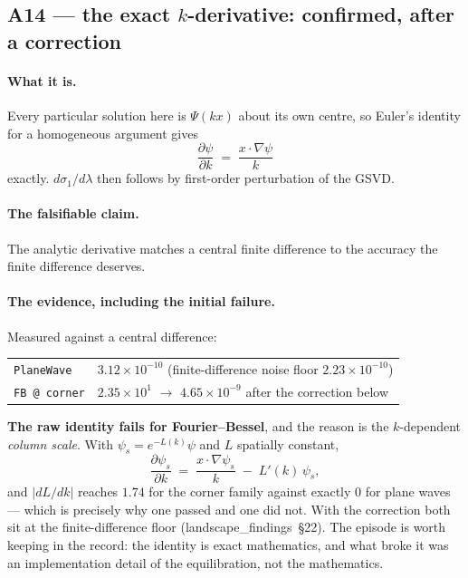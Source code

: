 \documentclass[11pt]{article}
\newcommand{\lf}[1]{(landscape\_findings~\S#1)}
\newcommand{\sig}{\sigma}
\newcommand{\sione}{\sig_1}
\newcommand{\lam}{\lambda}
\begin{document}
\subsection{\texorpdfstring{A14 --- the exact $k$-derivative: confirmed, after a correction}{A14 -- the exact k-derivative: confirmed, after a correction}}

\paragraph{What it is.} Every particular solution here is $\Psi(kx)$ about its own centre, so
Euler's identity for a homogeneous argument gives
\[
  \frac{\partial \psi}{\partial k} \;=\; \frac{x\cdot\nabla\psi}{k}
\]
exactly. $d\sione/d\lam$ then follows by first-order perturbation of the GSVD.

\paragraph{The falsifiable claim.} The analytic derivative matches a central finite difference to
the accuracy the finite difference deserves.

\paragraph{The evidence, including the initial failure.} Measured against a central difference:
\begin{center}
\begin{tabular}{ll}
\toprule
\verb|PlaneWave|   & $3.12\times10^{-10}$ \quad (finite-difference noise floor $2.23\times10^{-10}$) \\
\verb|FB @ corner| & $2.35\times10^{1}$ \;$\to$\; $4.65\times10^{-9}$ after the correction below \\
\bottomrule
\end{tabular}
\end{center}

\textbf{The raw identity fails for Fourier--Bessel}, and the reason is the $k$-dependent
\emph{column scale}. With $\psi_s = e^{-L(k)}\psi$ and $L$ spatially constant,
\[
  \frac{\partial \psi_s}{\partial k}
  \;=\; \frac{x\cdot\nabla\psi_s}{k} \;-\; L'(k)\,\psi_s ,
\]
and $|dL/dk|$ reaches $1.74$ for the corner family against exactly $0$ for plane waves --- which is
precisely why one passed and one did not. With the correction both sit at the finite-difference
floor \lf{22}. The episode is worth keeping in the record: the identity is exact mathematics, and
what broke it was an implementation detail of the equilibration, not the mathematics.
\end{document}
